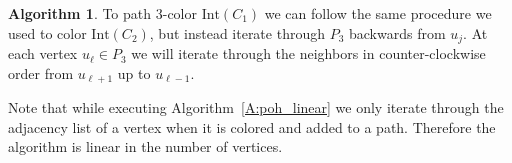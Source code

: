 \documentclass[12pt,letterpaper]{article}
\theoremstyle{plain}
\theoremstyle{definition}
\theoremstyle{break}
\newtheorem{algorithm}[lemma]{Algorithm}     %
\begin{document}
\begin{algorithm}
To path $3$-color $\text{Int}(C_1)$ we can follow the same procedure we used
to color $\text{Int}(C_2)$, but instead iterate through $P_3$ backwards from
$u_j$. At each
vertex $u_\ell\in P_3$ we will iterate through the neighbors in
counter-clockwise order from $u_{\ell+1}$ up to $u_{\ell - 1}$.

%    
%
%
%    
%
\end{algorithm}

Note that while executing Algorithm~\ref{A:poh_linear} we only iterate through
the adjacency list of a vertex when it is colored and added
to a path. Therefore the algorithm is linear in the number of vertices.
\end{document}
